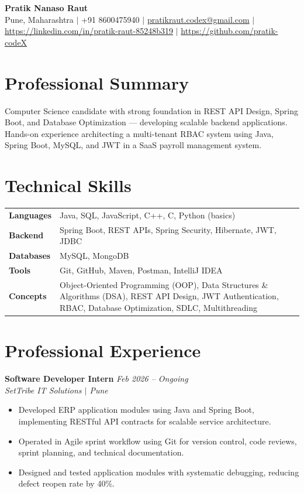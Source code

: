 \documentclass[10.5pt,a4paper]{article}
\begin{document}
\begin{center}
{\Large\bfseries Pratik Nanaso Raut}\\[2pt]
Pune, Maharashtra $|$ +91 8600475940 $|$ \href{mailto:pratikraut.codex@gmail.com}{pratikraut.codex@gmail.com} $|$ \href{https://linkedin.com/in/pratik-raut-85248b319}{https://linkedin.com/in/pratik-raut-85248b319} $|$ \href{https://github.com/pratik-codeX}{https://github.com/pratik-codeX}
\end{center}
\vspace{-2pt}
\section{Professional Summary}
Computer Science candidate with strong foundation in REST API Design, Spring Boot, and Database Optimization — developing scalable backend applications.\\[2pt]
Hands-on experience architecting a multi-tenant RBAC system using Java, Spring Boot, MySQL, and JWT in a SaaS payroll management system.
\section{Technical Skills}
\begin{tabular}{@{}p{}p{}@{}}
\textbf{Languages} & Java, SQL, JavaScript, C++, C, Python (basics) \\[1pt]
\textbf{Backend} & Spring Boot, REST APIs, Spring Security, Hibernate, JWT, JDBC \\[1pt]
\textbf{Databases} & MySQL, MongoDB \\[1pt]
\textbf{Tools} & Git, GitHub, Maven, Postman, IntelliJ IDEA \\[1pt]
\textbf{Concepts} & Object-Oriented Programming (OOP), Data Structures \& Algorithms (DSA), REST API Design, JWT Authentication, RBAC, Database Optimization, SDLC, Multithreading \\
\end{tabular}
\section{Professional Experience}
\textbf{Software Developer Intern} \hfill \textit{Feb 2026 -- Ongoing}
\\\textit{SetTribe IT Solutions $|$ Pune}
\begin{itemize}
  \item Developed ERP application modules using Java and Spring Boot, implementing RESTful API contracts for scalable service architecture.
  \item Operated in Agile sprint workflow using Git for version control, code reviews, sprint planning, and technical documentation.
  \item Designed and tested application modules with systematic debugging, reducing defect reopen rate by 40\%.
\end{itemize}
\end{document}
